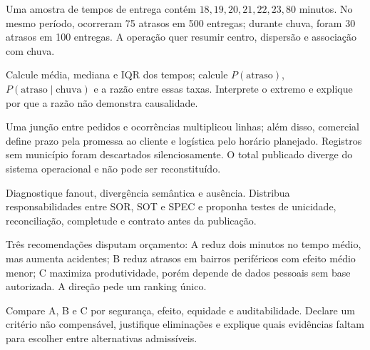 
\TextoBase

Uma amostra de tempos de entrega contém $18,19,20,21,22,23,80$ minutos. No mesmo período, ocorreram 75 atrasos em 500 entregas; durante chuva, foram 30 atrasos em 100 entregas. A operação quer resumir centro, dispersão e associação com chuva.

\FonteDidatica

\Comando Calcule média, mediana e IQR dos tempos; calcule $P(\text{atraso})$, $P(\text{atraso}\mid\text{chuva})$ e a razão entre essas taxas. Interprete o extremo e explique por que a razão não demonstra causalidade.


\TextoBase

Uma junção entre pedidos e ocorrências multiplicou linhas; além disso, comercial define prazo pela promessa ao cliente e logística pelo horário planejado. Registros sem município foram descartados silenciosamente. O total publicado diverge do sistema operacional e não pode ser reconstituído.

\FonteDidatica

\Comando Diagnostique fanout, divergência semântica e ausência. Distribua responsabilidades entre SOR, SOT e SPEC e proponha testes de unicidade, reconciliação, completude e contrato antes da publicação.


\TextoBase

Três recomendações disputam orçamento: A reduz dois minutos no tempo médio, mas aumenta acidentes; B reduz atrasos em bairros periféricos com efeito médio menor; C maximiza produtividade, porém depende de dados pessoais sem base autorizada. A direção pede um ranking único.

\FonteDidatica

\Comando Compare A, B e C por segurança, efeito, equidade e auditabilidade. Declare um critério não compensável, justifique eliminações e explique quais evidências faltam para escolher entre alternativas admissíveis.


\TextoBase

